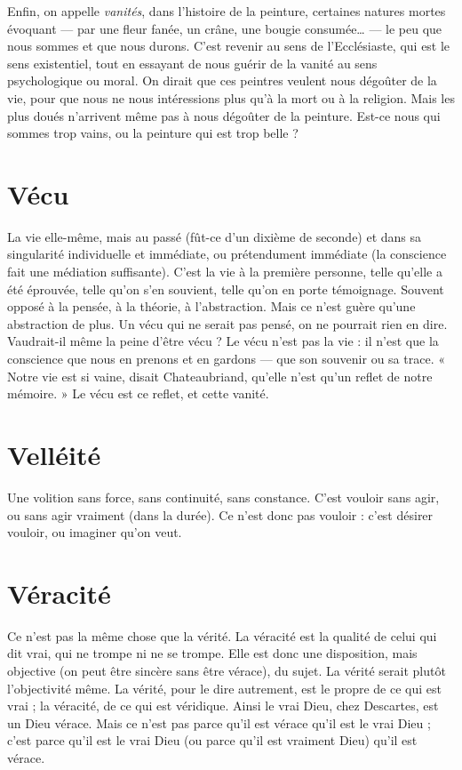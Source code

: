 Enfin, on appelle {\it vanités}, dans l’histoire de la peinture, certaines natures
mortes évoquant — par une fleur fanée, un crâne, une bougie consumée… — le
peu que nous sommes et que nous durons. C’est revenir au sens de l’Ecclésiaste,
qui est le sens existentiel, tout en essayant de nous guérir de la vanité au sens
psychologique ou moral. On dirait que ces peintres veulent nous dégoûter de
la vie, pour que nous ne nous intéressions plus qu’à la mort ou à la religion.
Mais les plus doués n’arrivent même pas à nous dégoûter de la peinture. Est-ce
nous qui sommes trop vains, ou la peinture qui est trop belle ?

\section{Vécu}
La vie elle-même, mais au passé (fût-ce d’un dixième de seconde) et
dans sa singularité individuelle et immédiate, ou prétendument
immédiate (la conscience fait une médiation suffisante). C’est la vie à la première
personne, telle qu’elle a été éprouvée, telle qu’on s’en souvient, telle
qu’on en porte témoignage. Souvent opposé à la pensée, à la théorie, à l’abstraction.
Mais ce n’est guère qu’une abstraction de plus. Un vécu qui ne serait
pas pensé, on ne pourrait rien en dire. Vaudrait-il même la peine d’être vécu ?
Le vécu n’est pas la vie : il n’est que la conscience que nous en prenons et
en gardons — que son souvenir ou sa trace. « Notre vie est si vaine, disait Chateaubriand,
qu’elle n’est qu’un reflet de notre mémoire. » Le vécu est ce reflet,
et cette vanité.

\section{Velléité}
Une volition sans force, sans continuité, sans constance. C’est
vouloir sans agir, ou sans agir vraiment (dans la durée). Ce n’est
donc pas vouloir : c’est désirer vouloir, ou imaginer qu’on veut.

\section{Véracité}
Ce n’est pas la même chose que la vérité. La véracité est la qualité
de celui qui dit vrai, qui ne trompe ni ne se trompe. Elle est
donc une disposition, mais objective (on peut être sincère sans être vérace), du
sujet. La vérité serait plutôt l’objectivité même. La vérité, pour le dire autrement,
est le propre de ce qui est vrai ; la véracité, de ce qui est véridique. Ainsi
le vrai Dieu, chez Descartes, est un Dieu vérace. Mais ce n’est pas parce qu’il
est vérace qu’il est le vrai Dieu ; c’est parce qu’il est le vrai Dieu (ou parce qu’il
est vraiment Dieu) qu’il est vérace.

